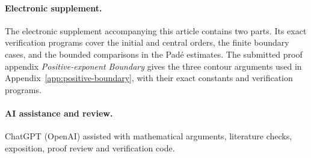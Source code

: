 \documentclass[11pt]{article}
\theoremstyle{remark}
\begin{document}
\paragraph{Electronic supplement.}
The electronic supplement accompanying this article contains two parts.
Its exact verification programs cover the initial and central orders,
the finite boundary cases, and the bounded comparisons in the
Pad\'e estimates. The submitted proof appendix
\textit{Positive-exponent Boundary} gives the three contour
arguments used in Appendix~\ref{app:positive-boundary}, with their
exact constants and verification programs.

\paragraph{AI assistance and review.}
ChatGPT (OpenAI) assisted with mathematical arguments, literature checks,
exposition, proof review and verification code.

\appendix







\end{document}
